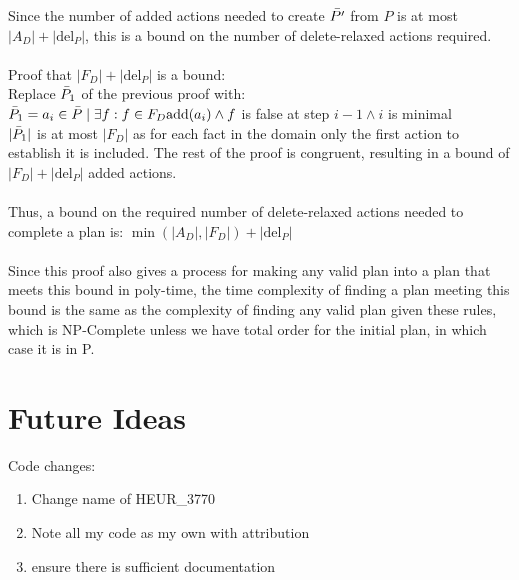 \documentclass[runningheads]{llncs}
\begin{document}
Since the number of added actions needed to create $\Bar{P'}$ from $P$ is at most $|A_D|+ |\text{del}_P|$, this is a bound on the number of delete-relaxed actions required.
\\\\
Proof that $|F_D|+ |\text{del}_P|$ is a bound:\\
Replace $\Bar{P}_1$ of the previous proof with:\\
$\Bar{P}_1=a_i\in\Bar{P}\mid \exists f: f\in F_D \text{add}(a_i)\wedge f$ is false at step $i-1 \wedge i$ is minimal\\
$|\Bar{P}_1|$ is at most $|F_D|$ as for each fact in the domain only the first action to establish it is included. The rest of the proof is congruent, resulting in a bound of $|F_D|+ |\text{del}_P|$ added actions.\\\\
Thus, a bound on the required number of delete-relaxed actions needed to complete a plan is: $\min (|A_D|,|F_D|)+ |\text{del}_P|$
\\\\
Since this proof also gives a process for making any valid plan into a plan that meets this bound in poly-time, the time complexity of finding a plan meeting this bound is the same as the complexity of finding any valid plan given these rules, which is NP-Complete unless we have total order for the initial plan, in which case it is in P.~\cite{Bercher2021POCLComplexities} 

\section{Future Ideas}
Code changes:
\begin{enumerate}
    \item Change name of HEUR\_3770
    \item Note all my code as my own with attribution
    \item ensure there is sufficient documentation
\end{enumerate}
\end{document}
